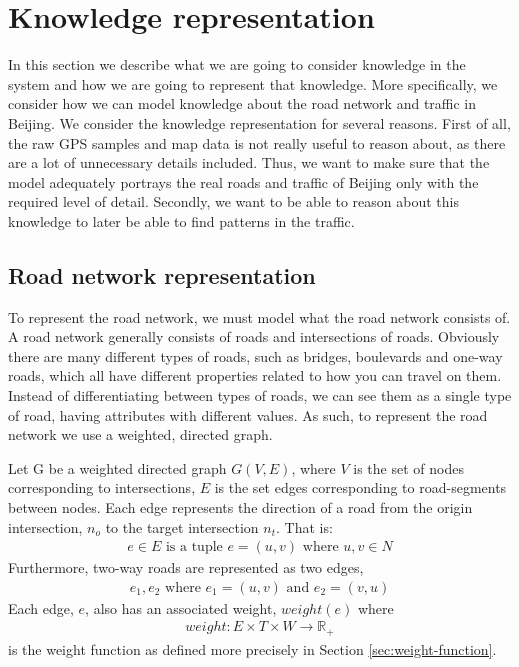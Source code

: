 \section{Knowledge representation}
In this section we describe what we are going to consider knowledge in the system and how we are going to represent that knowledge. More specifically, we consider how we can model knowledge about the road network and traffic in Beijing. We consider the knowledge representation for several reasons. First of all, the raw GPS samples and map data is not really useful to reason about, as there are a lot of unnecessary details included. Thus, we want to make sure that the model adequately portrays the real roads and traffic of Beijing only with the required level of detail. Secondly, we want to be able to reason about this knowledge to later be able to find patterns in the traffic.

\subsection{Road network representation}\label{sec:road-network-rep}
To represent the road network, we must model what the road network consists of. A road network generally consists of roads and intersections of roads. Obviously there are many different types of roads, such as bridges, boulevards and one-way roads, which all have different properties related to how you can travel on them. Instead of differentiating between types of roads, we can see them as a single type of road, having attributes with different values. As such, to represent the road network we use a weighted, directed graph.

Let G be a weighted directed graph $G(V,E)$, where $V$ is the set of nodes corresponding to intersections, $E$ is the set edges corresponding to road-segments between nodes. Each edge represents the direction of a road from the origin intersection, $n_o$ to the target intersection $n_t$. That is:
\begin{align*}
  e \in E \text{ is a tuple } e=(u, v) \text{ where } u, v \in N
\end{align*}
Furthermore, two-way roads are represented as two edges,
\begin{align*}
  e_1, e_2 \text{ where } e_1 = (u, v) \text{ and } e_2=(v, u)
\end{align*}
Each edge, $e$, also has an associated weight, $weight(e)$ where
\begin{align}
weight: E \times T \times W \rightarrow \mathbb R_+
\end{align}
 is the weight function as defined more precisely in Section \ref{sec:weight-function}.

